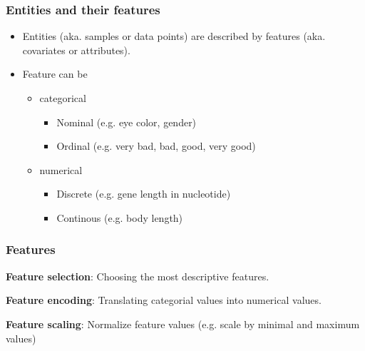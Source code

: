 \documentclass[aspectratio=169]{beamer}
\begin{document}
\begin{frame}
  \frametitle{Entities and their features}
  \begin{block}{}
    \begin{center}
      \begin{itemize}
      \item Entities (aka. samples or data points) are described by
        features (aka.  covariates or attributes).
      \item Feature can be
        \begin{itemize}
        \item categorical
          \begin{itemize}
          \item Nominal (e.g. eye color, gender)
          \item Ordinal (e.g. very bad, bad, good, very good)
          \end{itemize}
        \item numerical
          \begin{itemize}
          \item Discrete (e.g. gene length in nucleotide)
          \item Continous (e.g. body length)
          \end{itemize}
        \end{itemize}
      \end{itemize}
    \end{center}
  \end{block}    
\end{frame}

\begin{frame}
  \frametitle{Features}
  \begin{block}{}
    \begin{center}
      \textbf{Feature selection}: Choosing the most descriptive
      features.
    \end{center}  
  \end{block}

  \begin{block}{}
    \begin{center}
      \textbf{Feature encoding}: Translating categorial values into
      numerical values.
    \end{center}  
  \end{block}  

  \begin{block}{}
    \begin{center}
      \textbf{Feature scaling}: Normalize feature values (e.g. scale
      by minimal and maximum values)
    \end{center}  
  \end{block}  
  
\end{frame}
\end{document}
